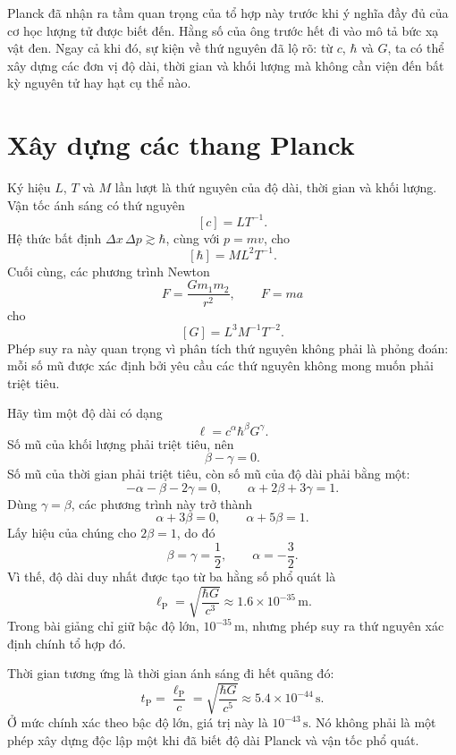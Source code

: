 Planck đã nhận ra tầm quan trọng của tổ hợp này trước khi ý nghĩa đầy đủ của cơ học lượng tử được biết đến. Hằng số của ông trước hết đi vào mô tả bức xạ vật đen. Ngay cả khi đó, sự kiện về thứ nguyên đã lộ rõ: từ \(c\), \(\hbar\) và \(G\), ta có thể xây dựng các đơn vị độ dài, thời gian và khối lượng mà không cần viện đến bất kỳ nguyên tử hay hạt cụ thể nào.

\section{Xây dựng các thang Planck}

Ký hiệu \(L\), \(T\) và \(M\) lần lượt là thứ nguyên của độ dài, thời gian và khối lượng. Vận tốc ánh sáng có thứ nguyên
\[
[c]=LT^{-1}.
\]
Hệ thức bất định \(\Delta x\,\Delta p\gtrsim\hbar\), cùng với \(p=mv\), cho
\[
[\hbar]=ML^2T^{-1}.
\]
Cuối cùng, các phương trình Newton
\[
F=\frac{Gm_1m_2}{r^2},
\qquad
F=ma
\]
cho
\[
[G]=L^3M^{-1}T^{-2}.
\]
Phép suy ra này quan trọng vì phân tích thứ nguyên không phải là phỏng đoán: mỗi số mũ được xác định bởi yêu cầu các thứ nguyên không mong muốn phải triệt tiêu.

Hãy tìm một độ dài có dạng
\begin{equation}
\ell=c^\alpha\hbar^\beta G^\gamma.
\label{eq:c10-length-ansatz}
\end{equation}
Số mũ của khối lượng phải triệt tiêu, nên
\[
\beta-\gamma=0.
\]
Số mũ của thời gian phải triệt tiêu, còn số mũ của độ dài phải bằng một:
\[
-\alpha-\beta-2\gamma=0,
\qquad
\alpha+2\beta+3\gamma=1.
\]
Dùng \(\gamma=\beta\), các phương trình này trở thành
\[
\alpha+3\beta=0,
\qquad
\alpha+5\beta=1.
\]
Lấy hiệu của chúng cho \(2\beta=1\), do đó
\[
\beta=\gamma=\frac12,
\qquad
\alpha=-\frac32.
\]
Vì thế, độ dài duy nhất được tạo từ ba hằng số phổ quát là
\begin{equation}
\ell_{\mathrm P}
=\sqrt{\frac{\hbar G}{c^3}}
\approx 1.6\times10^{-35}\,\mathrm m.
\label{eq:c10-planck-length}
\end{equation}
Trong bài giảng chỉ giữ bậc độ lớn, \(10^{-35}\,\mathrm m\), nhưng phép suy ra thứ nguyên xác định chính tổ hợp đó.

Thời gian tương ứng là thời gian ánh sáng đi hết quãng đó:
\begin{equation}
t_{\mathrm P}
=\frac{\ell_{\mathrm P}}{c}
=\sqrt{\frac{\hbar G}{c^5}}
\approx 5.4\times10^{-44}\,\mathrm s.
\label{eq:c10-planck-time}
\end{equation}
Ở mức chính xác theo bậc độ lớn, giá trị này là \(10^{-43}\,\mathrm s\). Nó không phải là một phép xây dựng độc lập một khi đã biết độ dài Planck và vận tốc phổ quát.

